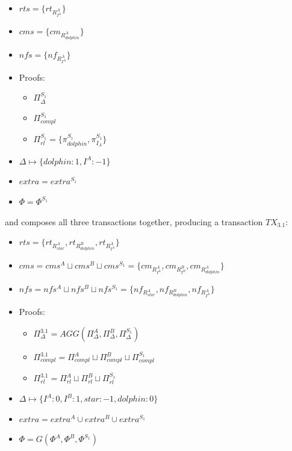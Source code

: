 \begin{itemize}
    \item $rts = \{rt_{R^A_{I^{A}}}\}$
    \item $cms = \{cm_{R^A_{dolphin}}\}$
    \item $nfs = \{nf_{R^A_{I^{A}}}\}$
        \item Proofs:
    \begin{itemize}
        \item $\Pi^{S_1}_{\Delta}$
        \item $\Pi^{S_1}_{compl}$
        \item $\Pi^{S_1}_{rl} = \{\pi^{S_1}_{dolphin}, \pi^{S_1}_{I_A}\}$
    \end{itemize}
    \item $\Delta \mapsto \{dolphin: 1, I^{A}: -1\}$
    \item $extra = extra^{S_1}$
    \item $\Phi = \Phi^{S_1}$
\end{itemize}

and composes all three transactions together, producing a transaction $TX_{3.1}$:

\begin{itemize}
    \item $rts = \{rt_{R^A_{star}}, rt_{R^B_{dolphin}}, rt_{R^A_{I^{A}}}\}$
    \item $cms = cms^{A} \sqcup cms^B \sqcup cms^{S_1} =\{
    cm_{R^A_{I^{A}}}, cm_{R^B_{I^{B}}}, cm_{R^A_{dolphin}}\}$
    \item $nfs = nfs^A \sqcup nfs^B \sqcup nfs^{S_1} = \{nf_{R^A_{star}}, nf_{R^B_{dolphin}}, nf_{R^A_{I^{A}}}\}$
        \item Proofs:
    \begin{itemize}
        \item $\Pi^{3.1}_{\Delta} = AGG(\Pi^A_{\Delta}, \Pi^B_{\Delta}, \Pi^{S_1}_{\Delta})$
        \item $\Pi^{3.1}_{compl} = \Pi^A_{compl} \sqcup \Pi^B_{compl} \sqcup \Pi^{S_1}_{compl}$
        \item $\Pi^{3.1}_{rl} = \Pi^A_{rl} \sqcup \Pi^B_{rl} \sqcup \Pi^{S_1}_{rl}$
    \end{itemize}
    \item $\Delta \mapsto \{I^{A}: 0, I^{B}: 1, star: -1, dolphin: 0\}$
    \item $extra = extra^A \cup extra^B \cup extra^{S_1}$
    \item $\Phi = G(\Phi^A, \Phi^B, \Phi^{S_1})$
\end{itemize}

